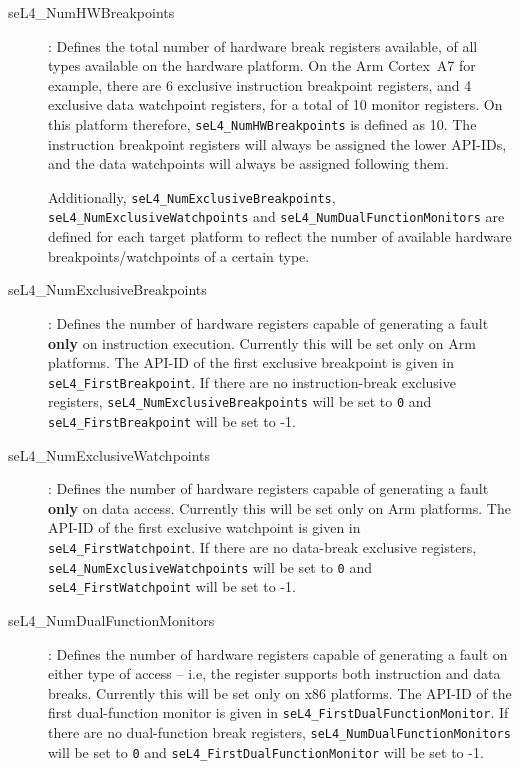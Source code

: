 \begin{description}
\item[seL4\_NumHWBreakpoints]: Defines the total number of hardware break
registers available, of all types available on the hardware platform. On the Arm
Cortex~A7 for example, there are 6 exclusive instruction breakpoint registers,
and 4 exclusive data watchpoint registers, for a total of 10 monitor registers.
On this platform therefore, \texttt{seL4\_NumHWBreakpoints} is defined as 10.
The instruction breakpoint registers will always be assigned the lower API-IDs,
and the data watchpoints will always be assigned following them.

Additionally, \texttt{seL4\_NumExclusiveBreakpoints}, \texttt{seL4\_NumExclusiveWatchpoints}
and \texttt{seL4\_NumDualFunctionMonitors}
are defined for each target platform to reflect the number of available
hardware breakpoints/watchpoints of a certain type.

\item[seL4\_NumExclusiveBreakpoints]: Defines the number of hardware registers
capable of generating a fault \textbf{only} on instruction execution. Currently this will be
set only on Arm platforms. The API-ID of the first exclusive breakpoint is given
in \texttt{seL4\_FirstBreakpoint}. If there are no instruction-break exclusive
registers, \texttt{seL4\_NumExclusiveBreakpoints} will be set to \texttt{0} and
\texttt{seL4\_FirstBreakpoint} will be set to -1.

\item[seL4\_NumExclusiveWatchpoints]: Defines the number of hardware registers
capable of generating a fault \textbf{only} on data access. Currently this will be set only
on Arm platforms. The API-ID of the first exclusive watchpoint is given
in \texttt{seL4\_FirstWatchpoint}. If there are no data-break exclusive
registers, \texttt{seL4\_NumExclusiveWatchpoints} will be set to \texttt{0} and
\texttt{seL4\_FirstWatchpoint} will be set to -1.

\item[seL4\_NumDualFunctionMonitors]: Defines the number of hardware registers
capable of generating a fault on either type of access -- i.e, the register
supports both instruction and data breaks. Currently this will be set only on
x86 platforms. The API-ID of the first dual-function monitor is given
in \texttt{seL4\_FirstDualFunctionMonitor}. If there are no dual-function break
registers, \texttt{seL4\_NumDualFunctionMonitors} will be set to \texttt{0} and
\texttt{seL4\_FirstDualFunctionMonitor} will be set to -1.

\end{description}

